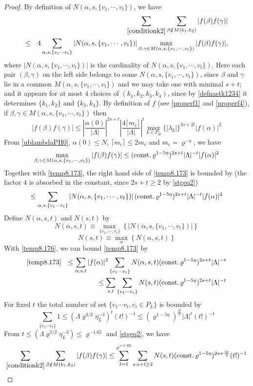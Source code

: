 \documentclass[11pt]{article}
\numberwithin{equation}{section}
\newcommand{\beq}{\begin{equation}}
\newcommand{\eeq}{\end{equation}}
\newcommand{\beqa}{\begin{eqnarray}}
\newcommand{\eeqa}{\end{eqnarray}}
\newcommand\const{{\rm const.\, }}
\newcommand\al{{\alpha}}
\newcommand\be{\beta}
\renewcommand\rho\varrho
\theoremstyle{definition}
\begin{document}
\begin{proof}
By definition of $N(\al,s,\{v_1,\cdots,v_t\})$, we have
\beqa\label{temp8.173}
&&\sum_{\eqref{conditionk2}}\sum_{\be\notin M(k_1,k_2)}\left|f(\be)f(\gamma)\right|\\\nonumber
\leq &&4\sum_{\al, s, \{v_1\cdots v_t\}}\left|N(\al,s,\{v_1,\cdots,v_t\})\right|\max_{\be,\gamma\in M(\al,s,\{v_1,\cdots,v_t\})}{\left|f(\be)f(\gamma)\right|}, 
\eeqa
where $\left|N(\al,s,\{v_1,\cdots,v_t\})\right|$ is the cardinality of $N(\al,s,\{v_1,\cdots,v_t\})$. Here each pair $(\be,\gamma)$ on the left side belongs to some $N(\al,s,\{v_1,\cdots,v_t\})$, since $\be$ and $\gamma$ lie in a common $M(\al,s,\{v_1,\cdots,v_t\})$ and we may take one with minimal $s+t$; and it appears for at most $4$ choices of $(k_1,k_2,k_3,k_4)$, since by \eqref{defnastk1234} it determines $\{k_1,k_2\}$ and $\{k_3,k_4\}$.
By definition of $f$ (see \eqref{properf1} and \eqref{properf4}),  if $\be,\gamma\in M(\al,s,\{v_1,\cdots,v_t\})$ then 
\beq
|f(\beta)f(\gamma)|\leq \left|\frac{\al(0)}{|\Lambda|}\right|^{2s+t} \left|\frac {4\lceil m_c\rceil}{|\Lambda|}\right|^{t }\max_{k\in P_H}\{|\lambda_k|\}^{2s+2t}|f(\al)|^2
\eeq
{F}rom \eqref{ublambdaPH0}, $\al(0)\leq N$, $\lceil m_c\rceil\leq 2m_c$ and $m_c=\rho^{-\eta}$, we have
\beq
\max_{\be,\gamma\in M(\al,s,\{v_1,\cdots,v_t\})}{\left|f(\be)f(\gamma)\right|}\leq (\const\rho^{1-5\eta})^{2s+t}|\Lambda|^{-t}|f(\al)|^2\\\nonumber
\eeq
Together with \eqref{temp8.173}, the right hand side of \eqref{temp8.173} is bounded by (the factor $4$ is absorbed in the constant, since $2s+t\geq 2$ by \eqref{stgeq2})
\beq\label{temp8.176}
\le  \sum_{\al, s, \{v_1\cdots v_t\}}\left|N(\al,s,\{v_1,\cdots,v_t\})\right|(\const\rho^{1-5\eta})^{2s+t}|\Lambda|^{-t}|f(\al)|^2
\eeq
Define $N(\al,s,t)$ and $ N(s,t)$ by 
\beq
 N(\al, s,t)\equiv \max_{ \{v_1,\cdots,v_t\}}\left\{\left| N(\al, s,\{v_1,\cdots,v_t\})\right|\right\}
\eeq
\beq
 N(s,t)\equiv \max_{\al}\left\{ N(\al, s,t)\right\}
\eeq
With \eqref{temp8.176}, we can bound \eqref{temp8.173} by 
\beqa\nonumber
\eqref{temp8.173}&&\leq \sum_{\al, s,t}|f(\al)|^2\sum_{\{v_1\cdots v_t\}} N(\al, s,t)(\const\rho^{1-5\eta})^{2s+t}|\Lambda|^{-t}\\
&&\leq \sum_{s,t}\sum_{\{v_1\cdots v_t\}} N( s,t)(\const\rho^{1-5\eta})^{2s+t}|\Lambda|^{-t}
\eeqa
For fixed $t$ the total number of set $\{v_1\cdots v_t, v_i \in P_L\}$ is bounded by
$$
\sum_{\{v_1\cdots v_t\}}1\leq (\Lambda\rho^{3/2}\eta_L^{-3})^t(t!)^{-1}\leq (\rho^{1-5\eta})^{\frac{3t}2}|\Lambda|^{t}(t!)^{-1}
$$
{F}rom  $t\leq (\Lambda\rho^{3/2}\eta_L^{-3})\leq \rho^{-1.65}$ and  \eqref{stgeq2}, we have 
\beq\label{temp8.178}
\sum_{\eqref{conditionk2}}\sum_{\be\notin M(k_1,k_2)}\left|f(\be)f(\gamma)\right | \leq \sum_{t=1}^{\rho^{-1.65}}\sum_{s: s+t\geq 2} N( s,t)(\const\rho^{1-5\eta})^{2s+\frac{5t}2}(t!)^{-1}
\eeq



\end{proof}
\end{document}
